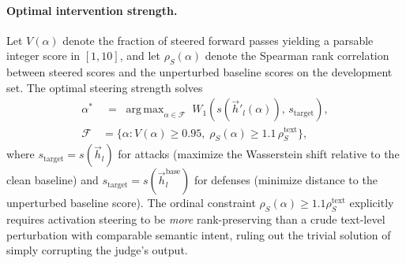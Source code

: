 \documentclass[11pt]{article}
\DeclareMathOperator*{\argmax}{arg\,max}
\begin{document}
\paragraph{Optimal intervention strength.}
Let $V(\alpha)$ denote the fraction of steered forward passes yielding a parsable integer score in $[1,10]$, and let $\rho_S(\alpha)$ denote the Spearman rank correlation between steered scores and the unperturbed baseline scores on the development set. The optimal steering strength solves
\begin{equation}
\label{eq:alpha_obj}
\begin{aligned}
\alpha^{*} &\;=\; \argmax_{\alpha \in \mathcal{F}}\; W_1\!\left(s(\vec{h}'_l(\alpha)),\, s_{\text{target}}\right), \\
\mathcal{F} &= \bigl\{\alpha : V(\alpha) \geq 0.95,\; \rho_S(\alpha) \geq 1.1\,\rho_S^{\text{text}} \bigr\},
\end{aligned}
\end{equation}
where $s_{\text{target}} = s(\vec{h}_l)$ for attacks (maximize the Wasserstein shift relative to the clean baseline) and $s_{\text{target}} = s(\vec{h}_l^{\text{base}})$ for defenses (minimize distance to the unperturbed baseline score). The ordinal constraint $\rho_S(\alpha) \geq 1.1\rho_S^{\text{text}}$ explicitly requires activation steering to be \emph{more} rank-preserving than a crude text-level perturbation with comparable semantic intent, ruling out the trivial solution of simply corrupting the judge's output.
\end{document}
